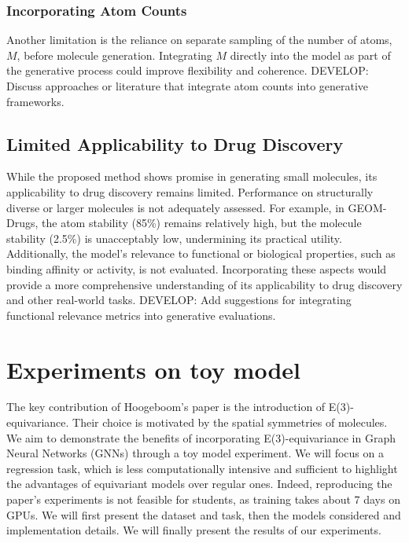 \documentclass[sigconf]{acmart}
\begin{document}
\subsubsection{Incorporating Atom Counts}
Another limitation is the reliance on separate sampling of the number of atoms, \(M\), before molecule generation. Integrating \(M\) directly into the model as part of the generative process could improve flexibility and coherence. DEVELOP: Discuss approaches or literature that integrate atom counts into generative frameworks.

\subsection{Limited Applicability to Drug Discovery}
While the proposed method shows promise in generating small molecules, its applicability to drug discovery remains limited. Performance on structurally diverse or larger molecules is not adequately assessed. For example, in GEOM-Drugs, the atom stability (85\%) remains relatively high, but the molecule stability (2.5\%) is unacceptably low, undermining its practical utility. Additionally, the model’s relevance to functional or biological properties, such as binding affinity or activity, is not evaluated. Incorporating these aspects would provide a more comprehensive understanding of its applicability to drug discovery and other real-world tasks. DEVELOP: Add suggestions for integrating functional relevance metrics into generative evaluations.


\section{Experiments on toy model}
The key contribution of Hoogeboom's paper is the introduction of E(3)-equivariance. Their choice is motivated by the spatial symmetries of molecules. We aim to demonstrate the benefits of incorporating E(3)-equivariance in Graph Neural Networks (GNNs) through a toy model experiment. We will focus on a regression task, which is less computationally intensive and sufficient to highlight the advantages of equivariant models over regular ones. Indeed, reproducing the paper's experiments is not feasible for students, as training takes about 7 days on GPUs. We will first present the dataset and task, then the models considered and implementation details. We will finally present the results of our experiments.
\end{document}
